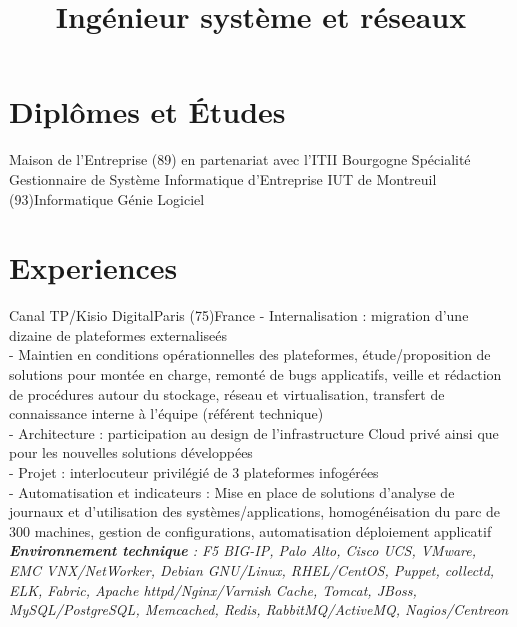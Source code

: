 \documentclass[10pt,a4paper]{moderncv}
\title{Ingénieur système et réseaux}
\begin{document}
\maketitle

\section{Diplômes et Études}
{Maison de l'Entreprise (89) en partenariat avec l'ITII Bourgogne}{}{}
{Spécialité Gestionnaire de Système Informatique d'Entreprise}
{IUT de Montreuil (93)}{}{}{Informatique Génie Logiciel}


\section{Experiences}
{Canal TP/Kisio Digital}{Paris (75)}{France}
{
- Internalisation : migration d'une dizaine de plateformes externaliseés\\
- Maintien en conditions opérationnelles des plateformes, étude/proposition de solutions pour montée en charge, remonté de bugs applicatifs, veille et rédaction de procédures autour du stockage, réseau et virtualisation, transfert de connaissance interne à l'équipe (référent technique)\\
- Architecture : participation au design de l'infrastructure Cloud privé ainsi que pour les nouvelles solutions développées\\
- Projet : interlocuteur privilégié de 3 plateformes infogérées\\
- Automatisation et indicateurs : Mise en place de solutions d'analyse de journaux et d'utilisation des systèmes/applications, homogénéisation du parc de 300 machines, gestion de configurations, automatisation déploiement applicatif\\
\textit{\textbf{Environnement technique} : F5 BIG-IP, Palo Alto, Cisco UCS, VMware, EMC VNX/NetWorker, Debian GNU/Linux, RHEL/CentOS, Puppet, collectd, ELK, Fabric, Apache httpd/Nginx/Varnish Cache, Tomcat, JBoss, MySQL/PostgreSQL, Memcached, Redis, RabbitMQ/ActiveMQ, Nagios/Centreon}
\newline{}
}
\end{document}
